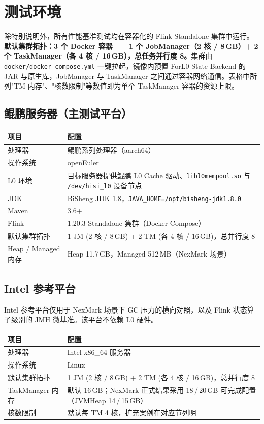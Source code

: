 \documentclass[a4paper,11pt]{article}
\newcommand{\project}{ForL0 State Backend}
\begin{document}
\section{测试环境}

除特别说明外，所有性能基准测试均在容器化的 Flink Standalone 集群中运行。\textbf{默认集群拓扑：3 个 Docker 容器——1 个 JobManager（2 核 / 8\,GB）+ 2 个 TaskManager（各 4 核 / 16\,GB），总任务并行度 8。}集群由 \texttt{docker/docker-compose.yml} 一键拉起，镜像内预置 \project{} 的 JAR 与原生库，JobManager 与 TaskManager 之间通过容器网络通信。表格中所列"TM 内存"、"核数限制"等数值即为单个 TaskManager 容器的资源上限。

\subsection{鲲鹏服务器（主测试平台）}

\begin{table}[H]
\centering
\small
\begin{tabularx}{\textwidth}{L{3.2cm} X}
\toprule
\textbf{项目} & \textbf{配置} \\
\midrule
处理器 & 鲲鹏系列处理器（aarch64） \\
操作系统 & openEuler \\
L0 环境 & 目标服务器提供鲲鹏 L0 Cache 驱动、\texttt{libl0mempool.so} 与 \texttt{/dev/hisi\_l0} 设备节点 \\
JDK & BiSheng JDK 1.8，\texttt{JAVA\_HOME=/opt/bisheng-jdk1.8.0} \\
Maven & 3.6+ \\
Flink & 1.20.3 Standalone 集群（Docker Compose） \\
默认集群拓扑 & 1 JM (2 核 / 8\,GB) + 2 TM (各 4 核 / 16\,GB)，总并行度 8 \\
Heap / Managed 内存 & Heap 11.7\,GB，Managed 512\,MB（NexMark 场景） \\
\bottomrule
\end{tabularx}
\end{table}

\subsection{Intel 参考平台}

Intel 参考平台仅用于 NexMark 场景下 GC 压力的横向对照，以及 Flink 状态算子级别的 JMH 微基准。该平台不依赖 L0 硬件。

\begin{table}[H]
\centering
\small
\begin{tabularx}{\textwidth}{L{3.2cm} X}
\toprule
\textbf{项目} & \textbf{配置} \\
\midrule
处理器 & Intel x86\_64 服务器 \\
操作系统 & Linux \\
默认集群拓扑 & 1 JM (2 核 / 8\,GB) + 2 TM (各 4 核 / 16\,GB)，总并行度 8 \\
TaskManager 内存 & 默认 16\,GB；NexMark 正式结果采用 18\,/\,20\,GB 可完成配置（JVMHeap 14\,/\,15\,GB） \\
核数限制 & 默认每 TM 4 核，扩充案例在对应节列明 \\
\bottomrule
\end{tabularx}
\end{table}
\end{document}
